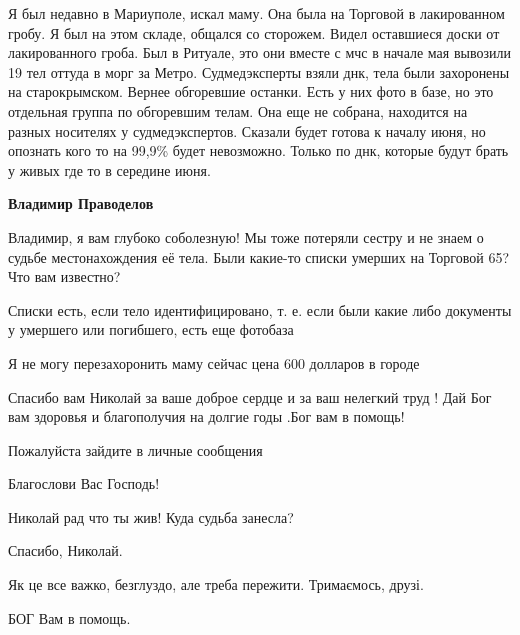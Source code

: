 
Я был недавно в Мариуполе, искал маму. Она была на Торговой в лакированном
гробу. Я был на этом складе, общался со сторожем. Видел оставшиеся доски от
лакированного гроба. Был в Ритуале, это они вместе с мчс в начале мая вывозили 19
тел оттуда в морг за Метро. Судмедэксперты взяли днк, тела были захоронены на
старокрымском. Вернее обгоревшие останки. Есть у них фото в базе, но это отдельная
группа по обгоревшим телам. Она еще не собрана, находится на разных носителях у
судмедэкспертов. Сказали будет готова к началу июня, но опознать кого то на 99,9\%
будет невозможно. Только по днк, которые будут брать у живых где то в середине
июня.

\begin{itemize} %
\textbf{Владимир Праводелов} 

Владимир, я вам глубоко соболезную! Мы тоже потеряли сестру и не знаем о судьбе
местонахождения её тела. Были какие-то списки умерших на Торговой 65? Что вам
известно?


Списки есть, если тело идентифицировано, т. е. если были какие либо документы у
умершего или погибшего, есть еще фотобаза
\end{itemize} %


Я не могу перезахоронить маму сейчас цена 600 долларов в городе


Спасибо вам Николай за ваше доброе сердце и за ваш нелегкий труд ! Дай Бог вам
здоровья и благополучия на долгие годы .Бог вам в помощь!


Пожалуйста зайдите в личные сообщения


Благослови Вас Господь!

Николай рад что ты жив! Куда судьба занесла?

Спасибо, Николай.

Як це все важко, безглуздо, але треба пережити.
Тримаємось, друзі.



БОГ Вам в помощь.


